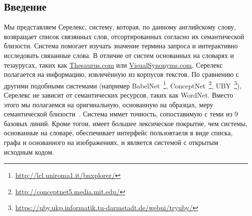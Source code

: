 \documentclass[a4paper,10pt,twoside]{article}
\begin{document}

\author{Панченко А.И.${}^{1,2}$, Романов П.В.${}^2$, Романов А.В${}^1$, \linebreak Филиппович А.Ю.${}^2$, Филиппович Ю.Н.${}^2$, Морозова О.Д.${}^1$}




\subsection{Введение}

Мы представляем Серелекс, систему, которая, по данному английскому слову, возвращает список связянных слов, отсортированных согласно их семантической близости. Система помогает изучать значение термина запроса и интерактивно исследовать связанные слова. В отличие от систем основанных на словарях и тезаурусах, таких как \url{Thesaurus.com} или \url{VisualSynonyms.com}, Серелекс полагается на информацию, извлечённую из корпусов текстов. По сравнению с другими подобными системами (например BabelNet~\footnote{ \url{http://lcl.uniroma1.it/bnxplorer/}}, ConceptNet~\footnote{ \url{http://conceptnet5.media.mit.edu/}}, UBY~\footnote{\url{https://uby.ukp.informatik.tu-darmstadt.de/webui/tryuby/}}), Серелекс не зависит от семантических ресурсов, таких как WordNet. Вместо этого мы полагаемся на оригинальную, основанную на образцах, меру семантической близости~\cite{panchenko2012konvens}. Система иммет точность, сопоставимую с теми из 9 базовых линий. Кроме тогои, имеет большее лексическое покрытие, чем системы, основанные на словаре, обеспечивает интерфейс 
пользовтаеля в виде списка, графа и основанного на изображениях, и является системой с открытым исходным кодом.
\end{document}
